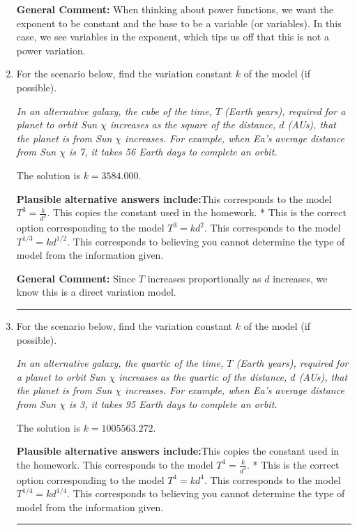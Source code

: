 \documentclass{extbook}[14pt]
\newcommand{\litem}[1]{\item #1

\rule{\textwidth}{0.4pt}}
\begin{document}
\begin{enumerate}
{\begin{enumerate}[label=\Alph*.]
\end{enumerate}

\textbf{General Comment:} When thinking about power functions, we want the exponent to be constant and the base to be a variable (or variables). In this case, we see variables in the exponent, which tips us off that this is not a power variation.
}
\litem{
For the scenario below, find the variation constant $k$ of the model (if possible).

\begin{center}
    \textit{ In an alternative galaxy, the cube of the time, $T$ (Earth years), required for a planet to orbit Sun $\chi$ increases as the square of the distance, $d$ (AUs), that the planet is from Sun $\chi$ increases. For example, when Ea's average distance from Sun $\chi$ is 7, it takes 56 Earth days to complete an orbit. }
\end{center}
The solution is \( k = 3584.000 \).\begin{enumerate}[label=\Alph*.]
\textbf{Plausible alternative answers include:}This corresponds to the model $T^{3} = \frac{k}{d^{2}}$.
This copies the constant used in the homework.
* This is the correct option corresponding to the model $T^{3} = k d^{2}$.
This corresponds to the model $T^{1/3} = k d^{1/2}$.
This corresponds to believing you cannot determine the type of model from the information given.
\end{enumerate}

\textbf{General Comment:} Since $T$ increases proportionally as $d$ increases, we know this is a direct variation model.
}
\litem{
For the scenario below, find the variation constant $k$ of the model (if possible).

\begin{center}
    \textit{ In an alternative galaxy, the quartic of the time, $T$ (Earth years), required for a planet to orbit Sun $\chi$ increases as the quartic of the distance, $d$ (AUs), that the planet is from Sun $\chi$ increases. For example, when Ea's average distance from Sun $\chi$ is 3, it takes 95 Earth days to complete an orbit. }
\end{center}
The solution is \( k = 1005563.272 \).\begin{enumerate}[label=\Alph*.]
\textbf{Plausible alternative answers include:}This copies the constant used in the homework.
This corresponds to the model $T^{4} = \frac{k}{d^{4}}$.
* This is the correct option corresponding to the model $T^{4} = k d^{4}$.
This corresponds to the model $T^{1/4} = k d^{1/4}$.
This corresponds to believing you cannot determine the type of model from the information given.
\end{enumerate}

}
\end{enumerate}
\end{document}
